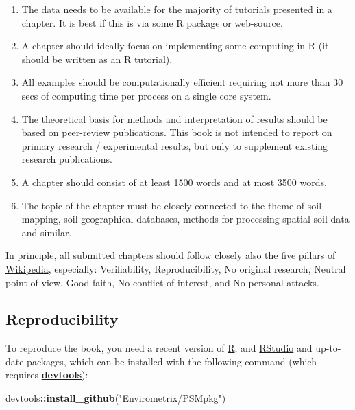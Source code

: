 \documentclass[graybox,natbib,nospthms]{svmono}
\newenvironment{Shaded}{\begin{snugshade}}{\end{snugshade}}
\newcommand{\KeywordTok}[1]{\textcolor[rgb]{0.13,0.29,0.53}{\textbf{#1}}}
\newcommand{\StringTok}[1]{\textcolor[rgb]{0.31,0.60,0.02}{#1}}
\newcommand{\OperatorTok}[1]{\textcolor[rgb]{0.81,0.36,0.00}{\textbf{#1}}}
\newcommand{\NormalTok}[1]{#1}
\providecommand{\tightlist}{%
  \setlength{\itemsep}{0pt}\setlength{\parskip}{0pt}}
\begin{document}
\begin{enumerate}
\def\labelenumi{\arabic{enumi}.}
\tightlist
\item
  The data needs to be available for the majority of tutorials presented
  in a chapter. It is best if this is via some R package or web-source.
\item
  A chapter should ideally focus on implementing some computing in R (it
  should be written as an R tutorial).
\item
  All examples should be computationally efficient requiring not more
  than 30 secs of computing time per process on a single core system.
\item
  The theoretical basis for methods and interpretation of results should
  be based on peer-review publications. This book is not intended to
  report on primary research / experimental results, but only to
  supplement existing research publications.
\item
  A chapter should consist of at least 1500 words and at most 3500
  words.
\item
  The topic of the chapter must be closely connected to the theme of
  soil mapping, soil geographical databases, methods for processing
  spatial soil data and similar.
\end{enumerate}

In principle, all submitted chapters should follow closely also the
\href{https://en.wikipedia.org/wiki/Wikipedia:Five_pillars}{five pillars
of Wikipedia}, especially: Verifiability, Reproducibility, No original
research, Neutral point of view, Good faith, No conflict of interest,
and No personal attacks.

\subsection*{Reproducibility}\label{reproducibility}

To reproduce the book, you need a recent version of
\href{https://cran.r-project.org}{R}, and
\href{http://www.rstudio.com/products/RStudio/}{RStudio} and up-to-date
packages, which can be installed with the following command (which
requires \href{https://github.com/hadley/devtools}{\textbf{devtools}}):

\begin{Shaded}
\begin{Highlighting}[]
\NormalTok{devtools}\OperatorTok{::}\KeywordTok{install_github}\NormalTok{(}\StringTok{"Envirometrix/PSMpkg"}\NormalTok{)}
\end{Highlighting}
\end{Shaded}
\end{document}
